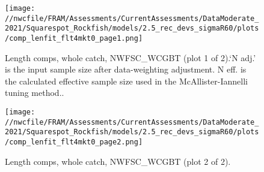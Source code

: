 \documentclass[11pt,
  english,
  a4paper,
]{article}
\begin{document}
\begin{figure}
\centering
\texttt{[image: //nwcfile/FRAM/Assessments/CurrentAssessments/DataModerate\_2021/Squarespot\_Rockfish/models/2.5\_rec\_devs\_sigmaR60/plots/comp\_lenfit\_flt4mkt0\_page1.png]}
\caption{Length comps, whole catch, NWFSC\_WCGBT (plot 1 of 2).`N adj.' is the input sample size after data-weighting adjustment. N eff. is the calculated effective sample size used in the McAllister-Iannelli tuning method..\label{fig:comp_lenfit_flt4mkt0_page1}}
\end{figure}

\tagmcend\tagstructend


\begin{figure}
\centering
\texttt{[image: //nwcfile/FRAM/Assessments/CurrentAssessments/DataModerate\_2021/Squarespot\_Rockfish/models/2.5\_rec\_devs\_sigmaR60/plots/comp\_lenfit\_flt4mkt0\_page2.png]}
\caption{Length comps, whole catch, NWFSC\_WCGBT (plot 2 of 2).\label{fig:comp_lenfit_flt4mkt0_page2}}
\end{figure}

\tagmcend\tagstructend
\end{document}
